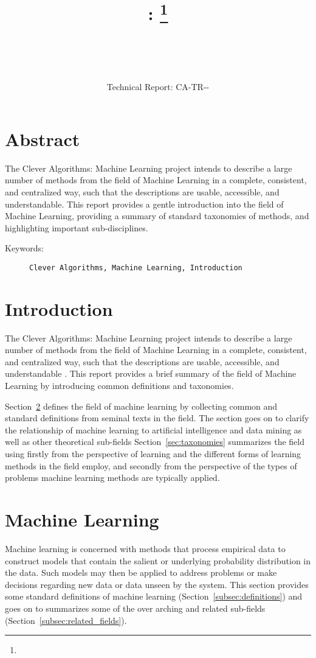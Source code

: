 \documentclass[a4paper, 11pt]{article}
\title{{\myreporttitle}: {\myreportsubtitle}\footnote{\myreportlicense}}
\author{\myreportauthor\\{\myreportemail}\\\small\myreportproject}
\date{\myreportfulldate\\{\small{Technical Report: CA-TR-{\myreportdate}-\myreportversion}}}
\begin{document}
\maketitle

\section*{Abstract} 
The Clever Algorithms: Machine Learning project intends to describe a large number of methods from the field of Machine Learning in a complete, consistent, and centralized way, such that the descriptions are usable, accessible, and understandable.
This report provides a gentle introduction into the field of Machine Learning, providing a summary of standard taxonomies of methods, and highlighting important sub-disciplines. 

\begin{description}
	\item[Keywords:] {\small\texttt{Clever Algorithms, Machine Learning, Introduction}}
\end{description} 

\section{Introduction}
\label{sec:introduction}
The Clever Algorithms: Machine Learning project intends to describe a large number of methods from the field of Machine Learning in a complete, consistent, and centralized way, such that the descriptions are usable, accessible, and understandable \cite{Brownlee2011a}.
This report provides a brief summary of the field of Machine Learning by introducing common definitions and taxonomies.

Section~\ref{sec:machine_learning} defines the field of machine learning by collecting common and standard definitions from seminal texts in the field. The section goes on to clarify the relationship of machine learning to artificial intelligence and data mining as well as other theoretical sub-fields
Section~\ref{sec:taxonomies} summarizes the field using firstly from the perspective of learning and the different forms of learning methods in the field employ, and secondly from the perspective of the types of problems machine learning methods are typically applied.

%
%
\section{Machine Learning}
\label{sec:machine_learning}
Machine learning is concerned with methods that process empirical data to construct models that contain the salient or underlying probability distribution in the data. Such models may then be applied to address problems or make decisions regarding new data or data unseen by the system.
This section provides some standard definitions of machine learning (Section~\ref{subsec:definitions}) and goes on to summarizes some of the over arching and related sub-fields (Section~\ref{subsec:related_fields}).
\end{document}
